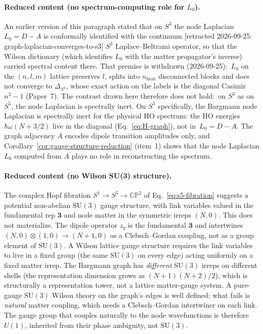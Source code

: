 \documentclass[twocolumn,pra,amsmath,amssymb,superscriptaddress]{revtex4-2}
\begin{document}
\paragraph{Reduced content (no spectrum-computing role for $L_0$).}
An earlier version of this paragraph stated that on $S^3$ the node
Laplacian $L_0 = D - A$ is conformally identified with the continuum [retracted 2026-09-25: graph-laplacian-converges-to-s3]
$S^3$ Laplace--Beltrami operator, so that the Wilson
dictionary (which identifies $L_0$ with the matter propagator's
inverse) carried spectral content there.  That premise is withdrawn
(2026-09-25):\ $L_0$ on the $(n,l,m)$ lattice preserves $l$, splits
into $n_{\max}$ disconnected blocks and does not converge to
$\Delta_{S^3}$, whose exact action on the labels is the diagonal Casimir
$n^2 - 1$ (Paper~7).  The contrast drawn here therefore does not hold:\
on $S^3$ as on $S^5$, the node Laplacian is spectrally inert.  On $S^5$
specifically, the Bargmann
node Laplacian is spectrally inert for the physical HO spectrum: the
HO energies $\hbar\omega(N + 3/2)$ live in the diagonal
(Eq.~\eqref{eq:H-graph}), not in~$L_0 = D - A$.  The graph adjacency
$A$ encodes dipole transition amplitudes only, and Corollary~\ref{cor:gauge-structure-reduction}
(item~1) shows that the node Laplacian $L_0$ computed from $A$ plays no role
in reconstructing the spectrum.

\paragraph{Reduced content (no Wilson SU(3) structure).}
The complex Hopf fibration $S^1\to S^5\to\mathbb{CP}^2$ of
Eq.~\eqref{eq:s5-fibration} suggests a potential non-abelian
$\mathrm{SU}(3)$ gauge structure, with link variables valued in the
fundamental rep $\mathbf{3}$ and node matter in the symmetric
irreps $(N, 0)$.  This does not materialize.  The dipole operator
$z_q$ is the fundamental $\mathbf{3}$ and intertwines
$(N, 0)\otimes(1, 0)\to(N+1, 0)$ as a Clebsch--Gordan coupling, not
as a group element of $\mathrm{SU}(3)$.  A Wilson lattice gauge
structure requires the link variables to live in a fixed group
(the same $\mathrm{SU}(3)$ on every edge) acting uniformly on a
fixed matter irrep.  The Bargmann graph has \emph{different}
$\mathrm{SU}(3)$ irreps on different shells (the representation
dimension grows as $(N+1)(N+2)/2$), which is structurally a
representation tower, not a lattice matter-gauge system.  A
pure-gauge $\mathrm{SU}(3)$ Wilson theory on the graph's edges is
well defined; what fails is \emph{natural} matter coupling, which
needs a Clebsch--Gordan intertwiner on each link.  The gauge group
that couples naturally to the node wavefunctions is therefore $U(1)$,
inherited from their phase ambiguity, not $\mathrm{SU}(3)$.
\end{document}
